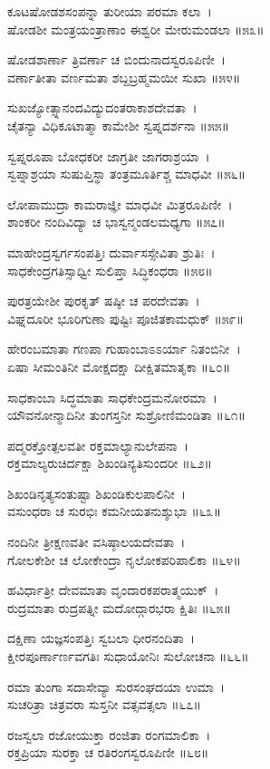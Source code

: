 ಕೂಟಷೋಡಶಸಂಪನ್ನಾ ತುರೀಯಾ ಪರಮಾ ಕಲಾ~।\\
ಷೋಡಶೀ ಮಂತ್ರಯಂತ್ರಾಣಾಂ ಈಶ್ವರೀ ಮೇರುಮಂಡಲಾ ॥೫೩॥

	ಷೋಡಶಾರ್ಣಾ ತ್ರಿವರ್ಣಾ ಚ ಬಿಂದುನಾದಸ್ವರೂಪಿಣೀ~।\\
	ವರ್ಣಾತೀತಾ ವರ್ಣಮತಾ ಶಬ್ದಬ್ರಹ್ಮಮಯೀ ಸುಖಾ ॥೫೪॥

ಸುಖಜ್ಯೋತ್ಸ್ನಾನಂದವಿದ್ಯುದಂತರಾಕಾಶದೇವತಾ~।\\
ಚೈತನ್ಯಾ ವಿಧಿಕೂಟಾತ್ಮಾ ಕಾಮೇಶೀ ಸ್ವಪ್ನದರ್ಶನಾ ॥೫೫॥

	ಸ್ವಪ್ನರೂಪಾ ಬೋಧಕರೀ ಜಾಗ್ರತೀ ಜಾಗರಾಶ್ರಯಾ~।\\
	ಸ್ವಪ್ನಾಶ್ರಯಾ ಸುಷುಪ್ತಿಸ್ಥಾ ತಂತ್ರಮೂರ್ತಿಶ್ಚ ಮಾಧವೀ ॥೫೬॥

ಲೋಪಾಮುದ್ರಾ ಕಾಮರಾಜ್ಞೀ ಮಾಧವೀ ಮಿತ್ರರೂಪಿಣೀ~।\\
ಶಾಂಕರೀ ನಂದಿವಿದ್ಯಾ ಚ ಭಾಸ್ವನ್ಮಂಡಲಮಧ್ಯಗಾ ॥೫೭॥

	ಮಾಹೇಂದ್ರಸ್ವರ್ಗಸಂಪತ್ತಿಃ ದುರ್ವಾಸಸ್ಸೇವಿತಾ ಶ್ರುತಿಃ~।\\
	ಸಾಧಕೇಂದ್ರಗತಿಸ್ಸಾಧ್ವೀ ಸುಲಿಪ್ತಾ ಸಿದ್ಧಿಕಂಧರಾ ॥೫೮॥

ಪುರತ್ರಯೇಶೀ ಪುರಕೃತ್ ಷಷ್ಠೀ ಚ ಪರದೇವತಾ~।\\
ವಿಘ್ನದೂರೀ ಭೂರಿಗುಣಾ ಪುಷ್ಟಿಃ ಪೂಜಿತಕಾಮಧುಕ್ ॥೫೯॥

	ಹೇರಂಬಮಾತಾ ಗಣಪಾ ಗುಹಾಂಬಾಽಽರ್ಯಾ ನಿತಂಬಿನೀ~।\\
	ಏಷಾ ಸೀಮಂತಿನೀ ಮೋಕ್ಷದಕ್ಷಾ ದೀಕ್ಷಿತಮಾತೃಕಾ ॥೬೦॥

ಸಾಧಕಾಂಬಾ ಸಿದ್ಧಮಾತಾ ಸಾಧಕೇಂದ್ರಮನೋರಮಾ~।\\
ಯೌವನೋನ್ಮಾದಿನೀ ತುಂಗಸ್ತನೀ ಸುಶ್ರೋಣಿಮಂಡಿತಾ ॥೬೧॥

	ಪದ್ಮರಕ್ತೋತ್ಪಲವತೀ ರಕ್ತಮಾಲ್ಯಾನುಲೇಪನಾ~।\\
	ರಕ್ತಮಾಲ್ಯರುಚಿರ್ದಕ್ಷಾ ಶಿಖಂಡಿನ್ಯತಿಸುಂದರೀ ॥೬೨॥

ಶಿಖಂಡಿನೃತ್ಯಸಂತುಷ್ಟಾ ಶಿಖಂಡಿಕುಲಪಾಲಿನೀ~।\\
ವಸುಂಧರಾ ಚ ಸುರಭಿಃ ಕಮನೀಯತನುಶ್ಶುಭಾ ॥೬೩॥

	ನಂದಿನೀ ತ್ರೀಕ್ಷಣವತೀ ವಸಿಷ್ಠಾಲಯದೇವತಾ~।\\
	ಗೋಲಕೇಶೀ ಚ ಲೋಕೇಂದ್ರಾ ನೃಲೋಕಪರಿಪಾಲಿಕಾ ॥೬೪॥

ಹವಿರ್ಧಾತ್ರೀ ದೇವಮಾತಾ ವೃಂದಾರಕಪರಾತ್ಮಯುಕ್~।\\
ರುದ್ರಮಾತಾ ರುದ್ರಪತ್ನೀ ಮದೋದ್ಗಾರಭರಾ ಕ್ಷಿತಿಃ ॥೬೫॥

	ದಕ್ಷಿಣಾ ಯಜ್ಞಸಂಪತ್ತಿಃ ಸ್ವಬಲಾ ಧೀರನಂದಿತಾ~।\\
	ಕ್ಷೀರಪೂರ್ಣಾರ್ಣವಗತಿಃ ಸುಧಾಯೋನಿಃ ಸುಲೋಚನಾ ॥೬೬॥

ರಮಾ ತುಂಗಾ ಸದಾಸೇವ್ಯಾ ಸುರಸಂಘದಯಾ ಉಮಾ~।\\
ಸುಚರಿತ್ರಾ ಚಿತ್ರವರಾ ಸುಸ್ತನೀ ವತ್ಸವತ್ಸಲಾ ॥೬೭॥

	ರಜಸ್ವಲಾ ರಜೋಯುಕ್ತಾ ರಂಜಿತಾ ರಂಗಮಾಲಿಕಾ~।\\
	ರಕ್ತಪ್ರಿಯಾ ಸುರಕ್ತಾ ಚ ರತಿರಂಗಸ್ವರೂಪಿಣೀ ॥೬೮॥

